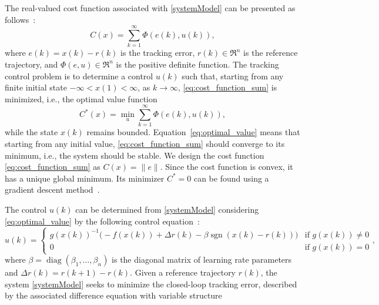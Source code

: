 
The real-valued cost function associated with \eqref{systemModel} can be
presented as follows~\cite{tymoshchuk2024tracking}:
\begin{equation}
	C(x) = \sum_{k=1}^{\infty} \Phi(e(k), u(k)),
	\label{eq:cost_function_sum}
\end{equation}
where $e(k) = x(k) - r(k)$ is the tracking error, $r(k) \in \mathfrak{R}^n$ is the
reference trajectory, and $\Phi(e, u) \in \mathfrak{R}^n$ is the positive definite
function. The tracking control problem is to determine a control $u(k)$ such
that, starting from any finite initial state $-\infty < x(1) < \infty$, as
$k \to \infty$, \eqref{eq:cost_function_sum} is minimized, i.e., the optimal
value function
\begin{equation}
	C^*(x) = \min_u \sum_{k=1}^{\infty} \Phi(e(k), u(k)),
	\label{eq:optimal_value}
\end{equation}
while the state $x(k)$ remains bounded. Equation~\eqref{eq:optimal_value}
means that starting from any initial value,
\eqref{eq:cost_function_sum} should converge to its minimum, i.e., the system
should be stable. We design the cost function
\eqref{eq:cost_function_sum} as $C(x) = \|e\|$. Since the cost function is
convex, it has a unique global minimum. Its minimizer $C^* = 0$ can be found
using a gradient descent method~\cite{cichocki1993neural}.

The control $u(k)$ can be determined from \eqref{systemModel} considering
\eqref{eq:optimal_value} by the following control
equation~\cite{tymoshchuk2024tracking}:
\begin{equation}
	u(k) = \begin{cases}
		g(x(k))^{-1} \bigl( -f(x(k)) + \Delta r(k) - \beta \operatorname{sgn}(x(k) - r(k)) \bigr) & \text{if } g(x(k)) \neq 0 \\
		0                                                                                         & \text{if } g(x(k)) = 0
	\end{cases},
	\label{eq:control_function}
\end{equation}
where $\beta = \operatorname{diag}(\beta_1, \ldots, \beta_n)$ is the diagonal
matrix of learning rate parameters and $\Delta r(k) = r(k+1) - r(k)$.
Given a reference trajectory $r(k)$, the system \eqref{systemModel} seeks to
minimize the closed-loop tracking error, described by the associated
difference equation with variable
structure~\cite{tymoshchuk2024tracking}


